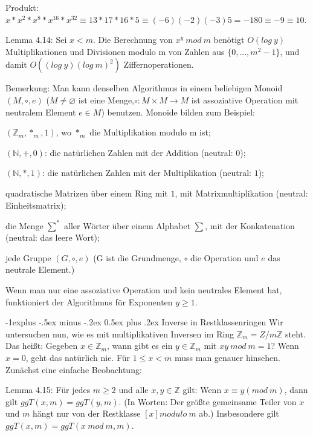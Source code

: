 \documentclass[a4paper]{article}
\makeatletter
\renewcommand{\subsection}{\@startsection{subsection}{2}{0mm}%
 {-1explus -.5ex minus -.2ex}%
 {0.5ex plus .2ex}%
 {\normalfont\normalsize\bfseries}}
\makeatother
\begin{document}
\begin{multicols}{3}
    Produkt: $x*x^2 *x^8 *x^{16} *x^{32} \equiv 13*17*16*5\equiv (-6)(-2)(-3)5 = -180\equiv -9\equiv 10$.

    Lemma 4.14: Sei $x<m$. Die Berechnung von $x^y\ mod\ m$ benötigt $O(log\ y)$ Multiplikationen und Divisionen modulo m von Zahlen aus $\{0,...,m^2-1\}$, und damit $O((log\ y)(log\ m)^2)$ Ziffernoperationen.

    Bemerkung: Man kann denselben Algorithmus in einem beliebigen Monoid $(M,\circ,e)$ ($M\not=\varnothing$ ist eine Menge,$\circ:M\times M \rightarrow M$ ist assoziative Operation mit neutralem Element $e\in M$) benutzen. Monoide bilden zum Beispiel:
    \begin{itemize*}
        \item $(\mathbb{Z}_m ,*_m,1)$, wo $*_m$ die Multiplikation modulo m ist;
        \item $(\mathbb{N},+,0)$: die natürlichen Zahlen mit der Addition (neutral: $0$);
        \item $(\mathbb{N},*,1)$: die natürlichen Zahlen mit der Multiplikation (neutral: $1$);
        \item quadratische Matrizen über einem Ring mit $1$, mit Matrixmultiplikation (neutral: Einheitsmatrix);
        \item die Menge $\sum^*$ aller Wörter über einem Alphabet $\sum$, mit der Konkatenation (neutral: das leere Wort);
        \item jede Gruppe $(G,\circ,e)$ (G ist die Grundmenge, $\circ$ die Operation und $e$ das neutrale Element.)
    \end{itemize*}

    Wenn man nur eine assoziative Operation und kein neutrales Element hat, funktioniert der Algorithmus für Exponenten $y\geq 1$.

    \subsection{Inverse in Restklassenringen}
    Wir untersuchen nun, wie es mit multiplikativen Inversen im Ring $\mathbb{Z}_m =Z/m\mathbb{Z}$ steht. Das heißt: Gegeben $x\in\mathbb{Z}_m$, wann gibt es ein $y\in\mathbb{Z}_m$ mit $xy\ mod\ m= 1$? Wenn $x=0$, geht das natürlich nie. Für $1\leq x<m$ muss man genauer hinsehen.
    Zunächst eine einfache Beobachtung:

    Lemma 4.15: Für jedes $m\geq 2$ und alle $x,y\in\mathbb{Z}$ gilt: Wenn $x\equiv y(mod\ m)$, dann gilt $ggT(x,m)=ggT(y,m)$. (In Worten: Der größte gemeinsame Teiler von $x$ und $m$ hängt nur von der Restklasse $[x] modulo\ m$ ab.) Insbesondere gilt $ggT(x,m) = ggT(x\ mod\ m,m)$.


\end{multicols}
\end{document}
